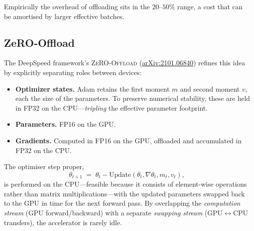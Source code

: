 \documentclass[11pt,a4paper]{article}
\theoremstyle{definition}
\theoremstyle{remark}
\theoremstyle{plain}
\newcommand{\grad}{\nabla}
\begin{document}
\begin{center}
\end{center}

Empirically the overhead of offloading sits in the $20$--$50\%$ range, a
cost that can be amortised by larger effective batches.

\subsection{ZeRO-Offload}

The DeepSpeed framework's \textsc{ZeRO-Offload}
(\href{https://arxiv.org/abs/2101.06840}{arXiv:2101.06840}) refines this
idea by explicitly separating roles between devices:

\begin{itemize}[leftmargin=1.5em, itemsep=2pt]
    \item \textbf{Optimizer states.} Adam retains the first moment $m$
    and second moment $v$, each the size of the parameters. To preserve
    numerical stability, these are held in FP32 on the CPU---\emph{tripling}
    the effective parameter footprint.
    \item \textbf{Parameters.} FP16 on the GPU.
    \item \textbf{Gradients.} Computed in FP16 on the GPU, offloaded and
    accumulated in FP32 on the CPU.
\end{itemize}

The optimiser step proper,
\begin{equation}
\theta_{t+1} \;=\; \theta_t - \mathrm{Update}\!\left(\theta_t,
    \grad\theta_t, m_t, v_t\right),
\end{equation}
is performed on the CPU---feasible because it consists of element-wise
operations rather than matrix multiplications---with the updated
parameters swapped back to the GPU in time for the next forward pass. By
overlapping the \emph{computation stream} (GPU forward/backward) with a
separate \emph{swapping stream} (GPU$\leftrightarrow$CPU transfers), the
accelerator is rarely idle.
\end{document}
